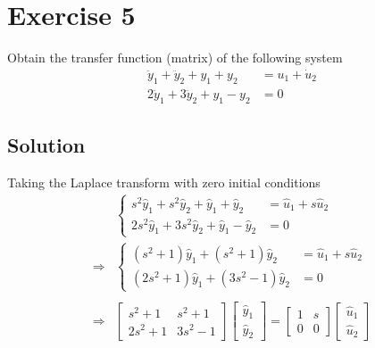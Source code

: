 \documentclass[12pt,a4paper]{article}
\begin{document}
\section*{Exercise 5}
Obtain the transfer function (matrix) of the following system
\[
\begin{aligned}
\ddot y_1+\ddot y_2+y_1+y_2 &= u_1+\dot u_2\\
2\ddot y_1+3\ddot y_2+y_1-y_2 &= 0
\end{aligned}
\]
\subsection*{Solution}

Taking the Laplace transform with zero initial conditions
\begin{align*}
	&\begin{cases}
		s^2 \hat y_1 + s^2 \hat y_2 + \hat y_1 + \hat y_2 &= \hat u_1 + s\hat u_2 \\
		2 s^2 \hat y_1 + 3 s^2 \hat y_2 + \hat y_1 - \hat y_2 &= 0
	\end{cases}
	\\ \Rightarrow & \begin{cases}
		 (s^2 + 1) \hat y_1 + (s^2 + 1)\hat y_2& = \hat u_1 + s \hat u_2 \\
		 (2s^2 + 1) \hat y_1 + (3s^2 -1)\hat y_2 &= 0
	\end{cases}	 \\
	\\ \Rightarrow &  \begin{bmatrix}
		s^2 + 1 & s^2 +1 \\
		2s^2 + 1 & 3 s^2 - 1
	\end{bmatrix} \begin{bmatrix}
	\hat y_1 \\ \hat y_2
	\end{bmatrix} = \begin{bmatrix}
	1 & s \\ 0 & 0 
	\end{bmatrix} \begin{bmatrix}
	\hat u_1 \\ \hat u_2
	\end{bmatrix}
\end{align*}
\end{document}
